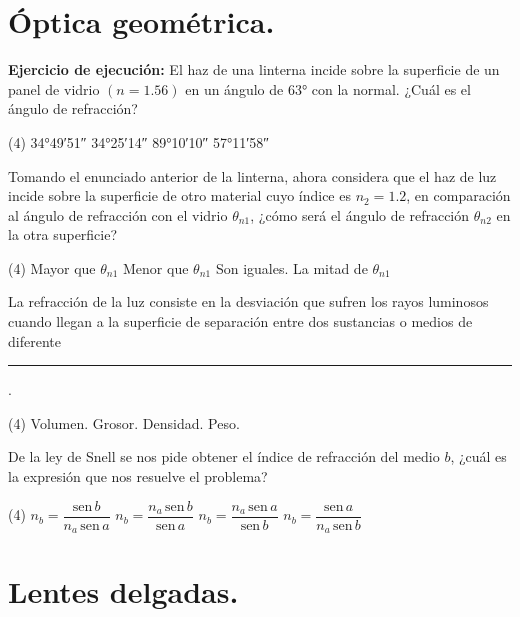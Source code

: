 \documentclass[12pt, letter]{exam}
\begin{document}
\begin{questions}
    \section{Óptica geométrica.}

    \question \label{Problema_01} \textbf{Ejercicio de ejecución: } El haz de una linterna incide sobre la superficie de un panel
    de vidrio $(n = 1.56)$ en un ángulo de \ang{63} con la normal. ¿Cuál es el ángulo de refracción?
    \begin{tasks}(4)
        \task \ang{34;49;51}
        \task \ang{34;25;14}
        \task \ang{89;10;10}
        \task \ang{57;11;58}
    \end{tasks}
    \question Tomando el enunciado anterior de la linterna, ahora considera que el haz de luz incide sobre la superficie de otro material cuyo índice es $n_{2} = 1.2$, en comparación al ángulo de refracción con el vidrio $\theta_{n1}$, ¿cómo será el ángulo de refracción $\theta_{n2}$ en la otra superficie?
    \begin{tasks}(4)
        \task Mayor que $\theta_{n1}$
        \task Menor que $\theta_{n1}$
        \task Son iguales.
        \task La mitad de $\theta_{n1}$
    \end{tasks}
    \question La refracción de la luz consiste en la desviación que sufren los rayos luminosos cuando llegan a la superficie de separación entre dos sustancias o medios de diferente \rule{2.5cm}{0.1mm}.
    \begin{tasks}(4)
        \task Volumen.
        \task Grosor.
        \task Densidad.
        \task Peso.
    \end{tasks}
    \question De la ley de Snell se nos pide obtener el índice de refracción del medio $b$, ¿cuál es la expresión que nos resuelve el problema?
    \begin{tasks}(4)
        \task $n_{b} = \dfrac{\text{sen} \, b}{n_{a} \, \text{sen} \, a}$
        \task $n_{b} = \dfrac{n_{a} \, \text{sen} \, b}{\text{sen} \, a}$
        \task $n_{b} = \dfrac{n_{a} \, \text{sen} \, a}{\text{sen} \, b}$
        \task $n_{b} = \dfrac{\text{sen} \, a}{n_{a} \, \text{sen} \, b}$
    \end{tasks}

    \section{Lentes delgadas.}


\end{questions}
\end{document}
